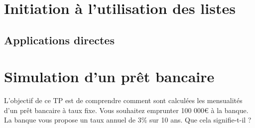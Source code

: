 \begin{multicols}{2}
\section*{Initiation à l'utilisation des listes}

\subsection*{Applications directes}



\ifprof
\begin{corrige}
\end{corrige}
\else
\fi

\ifprof
\begin{corrige}
\end{corrige}
\else
\fi

\ifprof
\begin{corrige}
\end{corrige}
\else
\fi


\ifprof
\begin{corrige}
\end{corrige}
\else
\fi

\ifprof
\begin{corrige}
\end{corrige}
\else
\fi

\ifprof
\begin{corrige}
\end{corrige}
\else
\fi


\section*{Simulation d'un prêt bancaire}

\begin{obj}
L'objectif de ce TP est de comprendre comment sont calculées les mensualités d'un prêt bancaire à taux fixe. Vous souhaitez emprunter 100 000€ à la banque. La banque vous propose un taux annuel de 3\% sur 10 ans. Que cela signifie-t-il ?
\end{obj}


\end{multicols}
